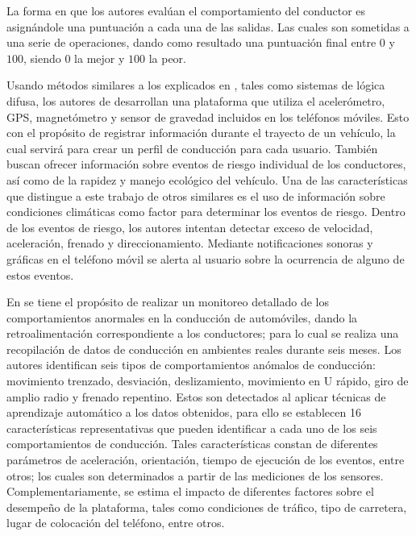 La forma en que los autores evalúan el comportamiento del conductor es asignándole una puntuación a cada una de las salidas. 
Las cuales son sometidas a una serie de operaciones, dando como resultado una puntuación final entre $0$ y $100$, siendo $0$ la mejor y $100$ la peor.

Usando métodos similares a los explicados en \cite{6728289}, tales como sistemas de lógica difusa, los autores de \cite{7014406} desarrollan una plataforma que utiliza el acelerómetro, GPS, magnetómetro y sensor de gravedad incluidos en los teléfonos móviles. Esto con el propósito de registrar información durante el trayecto de un vehículo, la cual servirá para crear un perfil de conducción para cada usuario. 
También buscan ofrecer información sobre eventos de riesgo individual de los conductores, así como de la rapidez y manejo ecológico del vehículo. 
Una de las características que distingue a este trabajo de otros similares es el uso de información sobre condiciones climáticas como factor para determinar los eventos de riesgo. 
Dentro de los eventos de riesgo, los autores intentan detectar exceso de velocidad, aceleración, frenado y direccionamiento. 
Mediante notificaciones sonoras y gráficas en el teléfono móvil se alerta al usuario sobre la ocurrencia de alguno de estos eventos.

En \cite{7338354} se tiene el propósito de realizar un monitoreo detallado de los comportamientos anormales en la conducción de automóviles, dando la retroalimentación correspondiente a los conductores; para lo cual se realiza una recopilación de datos de conducción en ambientes reales durante seis meses. 
Los autores identifican seis tipos de comportamientos anómalos de conducción: movimiento trenzado, desviación, deslizamiento, movimiento en U rápido, giro de amplio radio y frenado repentino.
Estos son detectados al aplicar técnicas de aprendizaje automático a los datos obtenidos, para ello se establecen 16 características representativas que pueden identificar a cada uno de los seis comportamientos de conducción. 
Tales características constan de diferentes parámetros de aceleración, orientación, tiempo de ejecución de los eventos, entre otros; los cuales son determinados a partir de las mediciones de los sensores. 
Complementariamente, se estima el impacto de diferentes factores sobre el desempeño de la plataforma, tales como condiciones de tráfico, tipo de carretera, lugar de colocación del teléfono, entre otros.

